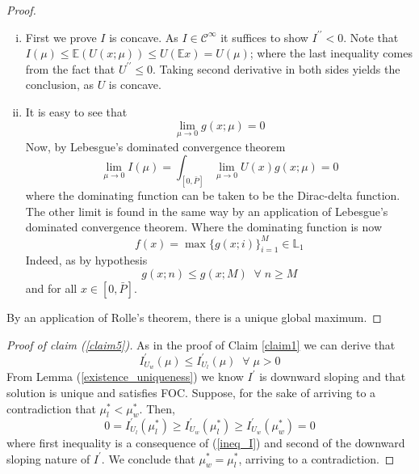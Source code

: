 \documentclass[10pt]{article}
\begin{document}
\begin{proof}

\begin{enumerate} [(i)]
    \item First we prove $I$ is concave. As $I\in\mathcal{C}^{\infty} $ it suffices to show $I^{\prime\prime}<0$. 
    Note that $I(\mu)\leq \mathbb{E}(U(x;\mu)) \leq U(\mathbb{E}x)=U(\mu)$; where the last inequality comes from the fact that $U^{\prime\prime}\leq 0$.
    Taking second derivative in both sides yields the conclusion, as $U$ is concave.\\
    
    \item It is easy to see that 
    \[\lim_{\mu\rightarrow 0} g(x;\mu)=0\]
    Now, by Lebesgue's dominated convergence theorem
   \[ \lim_{\mu\rightarrow 0}I(\mu)=\int_{[0,\bar{P}]}\lim_{\mu\rightarrow 0}U(x)g(x;\mu)=0\]
    where the dominating function can be taken to be the Dirac-delta function.\\
    
    The other limit is found in the same way by an application of Lebesgue's dominated convergence theorem. Where the dominating function is now
    \[f(x)=\max\lbrace g(x;i)\rbrace_{i=1}^{M}\in\mathbb{L}_1\]
    Indeed, as by hypothesis
    \[g(x;n)\leq g(x;M) \;\;\forall\; n\geq M\]
    and for all $x\in[0,\bar{P}]$.
    
\end{enumerate}

By an application of Rolle's theorem, there is a unique global maximum. 
\end{proof}



\begin{proof}[Proof of claim (\ref{claim5})]
As in the proof of Claim \ref{claim1} we can derive that
 \begin{equation}
 \label{ineq_I}
     I^{\prime}_{U_w}(\mu)\leq I^{\prime}_{U_l}(\mu)\;\;\forall\; \mu>0
 \end{equation}
 From Lemma (\ref{existence_uniqueness}) we know $I^{\prime}$ is downward sloping and that solution is unique and satisfies FOC. Suppose, for the sake of arriving to a contradiction that $\mu_l^*<\mu_w^*$. Then,
 \[ 0=I_{U_l}^{\prime}(\mu^{*}_l)\geq I_{U_w}^{\prime}(\mu^{*}_l)\geq I_{U_w}^{\prime}(\mu^{*}_w)=0 \]
 where first inequality is a consequence of (\ref{ineq_I}) and second of the downward sloping nature of $I^\prime$. We conclude that $\mu_w^*=\mu_l^*$, arriving to a contradiction.
\end{proof}
\end{document}
